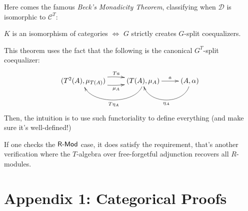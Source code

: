 \documentclass{article}
\begin{document}
Here comes the famous \emph{Beck's Monadicity Theorem}, classifying when $\mathcal{D}$ is isomorphic to $\mathcal{C}^T$:
\begin{thm}
    $K$ is an isomorphism of categories $\iff$ $G$ strictly creates $G$-split coequalizers. 
\end{thm}

This theorem uses the fact that the following is the canonical $G^T$-split coequalizer:
\[\xymatrix{
    (T^2(A),\mu_{T(A)}) \ar@/_{-.5pc}/[r]^-{Ta} \ar@/_{.5pc}/[r]_-{\mu_A} & (T(A),\mu_A)\ar@(d,d)[l]^-{T\eta_A} \ar[r]^-{a} & (A,\alpha) \ar@(d,d)[l]^-{\eta_A}
}\]
Then, the intuition is to use such functoriality to define everything (and make sure it's well-defined!)

\hfil

If one checks the $\mathsf{R}\text{-}\mathsf{Mod}$ case, it does satisfy the requirement, that's another verification where the $T$-algebra over free-forgetful adjunction recovers all $R$-modules.

\newpage

\section{Appendix 1: Categorical Proofs}
\end{document}
